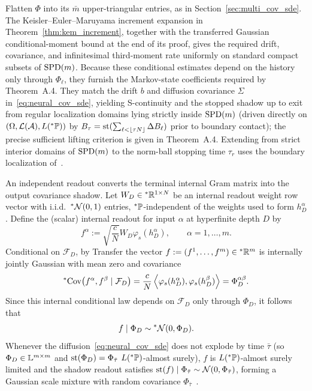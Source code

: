 \begin{proofsketch}
Flatten $\Phi$ into its $\bar{m}$ upper-triangular entries, as in Section~\ref{sec:multi_cov_sde}. The Keisler--Euler--Maruyama increment expansion in Theorem~\ref{thm:kem_increment}, together with the transferred Gaussian conditional-moment bound at the end of its proof, gives the required drift, covariance, and infinitesimal third-moment rate uniformly on standard compact subsets of $\operatorname{SPD}(m)$. Because these conditional estimates depend on the history only through $\Phi_\ell$, they furnish the Markov-state coefficients required by Theorem~A.4. They match the drift $b$ and diffusion covariance $\Sigma$ in~\eqref{eq:neural_cov_sde}, yielding S-continuity and the stopped shadow up to exit from regular localization domains lying strictly inside $\operatorname{SPD}(m)$ (driven directly on $(\Omega, \mathcal{L}(\mathcal{A}), L({}^*\mathbb{P}))$ by $B_\tau = \operatorname{st}(\sum_{\ell < \lfloor \tau N \rfloor} \Delta B_\ell)$ prior to boundary contact); the precise sufficient lifting criterion is given in Theorem~A.4. Extending from strict interior domains of $\operatorname{SPD}(m)$ to the norm-ball stopping time $\tau_r$ uses the boundary localization of~\cite[Appendices~A, C, and~D]{li2022neural}.
\end{proofsketch}

An independent readout converts the terminal internal Gram matrix into the output covariance shadow. Let $W_D \in {}^*\mathbb{R}^{1 \times N}$ be an internal readout weight row vector with i.i.d.\ ${}^*\mathcal{N}(0, 1)$ entries, ${}^*\mathbb{P}$-independent of the weights used to form $h_D^\alpha$. Define the (scalar) internal readout for input $\alpha$ at hyperfinite depth $D$ by
\begin{equation}\label{eq:shaped_readout}
f^\alpha := \sqrt{\frac{c}{N}} W_D \varphi_s(h_D^\alpha), \qquad \alpha = 1, \dots, m.
\end{equation}
Conditional on $\mathcal{F}_D$, by Transfer the vector $f := (f^1, \dots, f^m) \in {}^*\mathbb{R}^m$ is internally jointly Gaussian with mean zero and covariance
\begin{equation}\label{eq:readout_cond_cov}
{}^*\!\operatorname{Cov}\!\left(f^\alpha, f^\beta \mid \mathcal{F}_D\right) = \frac{c}{N}\left\langle \varphi_s(h_D^\alpha), \varphi_s(h_D^\beta) \right\rangle = \Phi_D^{\alpha\beta}.
\end{equation}
Since this internal conditional law depends on $\mathcal{F}_D$ only through $\Phi_D$, it follows that
\begin{equation}\label{eq:readout_given_phi}
f \mid \Phi_D \sim {}^*\mathcal{N}(0, \Phi_D).
\end{equation}
Whenever the diffusion~\eqref{eq:neural_cov_sde} does not explode by time $\bar{\tau}$ (so $\Phi_D \in \mathbb{L}^{m \times m}$ and $\operatorname{st}(\Phi_D) = \Phi_{\bar{\tau}}$ $L({}^*\mathbb{P})$-almost surely), $f$ is $L({}^*\mathbb{P})$-almost surely limited and the shadow readout satisfies $\operatorname{st}(f) \mid \Phi_{\bar{\tau}} \sim \mathcal{N}(0, \Phi_{\bar{\tau}})$, forming a Gaussian scale mixture with random covariance $\Phi_{\bar{\tau}}$~\cite[Theorems~3.2 and~3.9]{li2022neural}.

